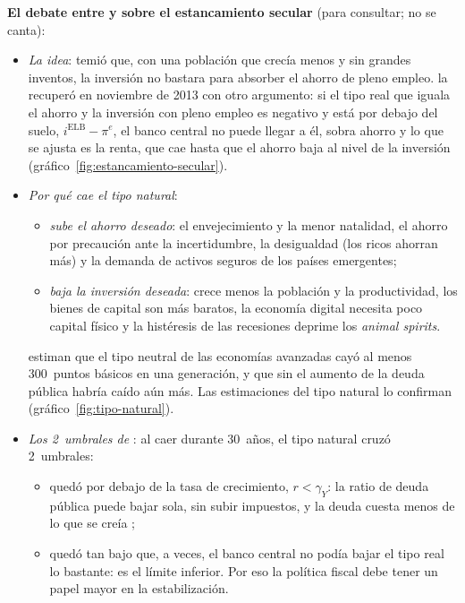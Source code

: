 \documentclass[11pt]{article}
\begin{document}
\begin{anotaciones}
\textbf{El debate entre  y  sobre el estancamiento secular} (para consultar; no se canta):
\begin{itemize}
\item \emph{La idea}: \textcite{Hansen1939Economic} temió que, con una población que crecía menos y sin grandes inventos, la inversión no bastara para absorber el ahorro de pleno empleo.  la recuperó en noviembre de 2013\nocite{Summers2013FMI,Summers2014Secular} con otro argumento: si el tipo real que iguala el ahorro y la inversión con pleno empleo es negativo y está por debajo del suelo, $i^{\mathrm{ELB}}-\pi^e$, el banco central no puede llegar a él, sobra ahorro y lo que se ajusta es la renta, que cae hasta que el ahorro baja al nivel de la inversión (gráfico~\ref{fig:estancamiento-secular}).
\item \emph{Por qué cae el tipo natural}\nocite{RachelSummers2019Secular}:
  \begin{itemize}
  \item \emph{sube el ahorro deseado}: el envejecimiento y la menor natalidad, el ahorro por precaución ante la incertidumbre, la desigualdad (los ricos ahorran más) y la demanda de activos seguros de los países emergentes;
  \item \emph{baja la inversión deseada}: crece menos la población y la productividad, los bienes de capital son más baratos, la economía digital necesita poco capital físico y la histéresis de las recesiones deprime los \emph{animal spirits}.
  \end{itemize}
  \textcite{RachelSummers2019Secular} estiman que el tipo neutral de las economías avanzadas cayó al menos 300~puntos básicos en una generación, y que sin el aumento de la deuda pública habría caído aún más. Las estimaciones del tipo natural lo confirman (gráfico~\ref{fig:tipo-natural}).
\item \emph{Los 2~umbrales de }: al caer durante 30~años, el tipo natural cruzó 2~umbrales\nocite{Blanchard2021LowRates,Blanchard2023Fiscal}:
  \begin{itemize}
  \item quedó por debajo de la tasa de crecimiento, $r<\gamma_Y$: la ratio de deuda pública puede bajar sola, sin subir impuestos, y la deuda cuesta menos de lo que se creía ;
  \item quedó tan bajo que, a veces, el banco central no podía bajar el tipo real lo bastante: es el límite inferior. Por eso la política fiscal debe tener un papel mayor en la estabilización.

\end{itemize}
\end{itemize}
\end{anotaciones}
\end{document}
